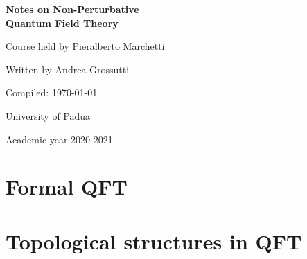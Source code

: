 \documentclass[a4paper]{report}
\newcommand{\onlyinsubfile}[1]{#1}
\newcommand{\onlyinmainfile}[1]{

\textsf{\red Part of the text is omitted from the compiled subfile, in order to make the compilation faster. You can find it in the main file. To avoid this, remove `` \textnormal{\textbackslash onlyinmainfile\{\ldots\}}'' from the code.}

}
\begin{document}
\renewcommand{\onlyinsubfile}[1]{}
\renewcommand{\onlyinmainfile}[1]{#1}

\begin{titlepage}
\begin{center}
       \vspace*{5cm}
       \textbf{\Huge Notes on Non-Perturbative\\[0.3em]
       Quantum Field Theory}
       
       \vspace{1cm}
        {\LARGE Course held by Pieralberto Marchetti}
        
        \vspace{1.5cm}
        {\Large Written by Andrea Grossutti}   
                 
       \vfill
       {\large Compiled: \today} 
           
       \vspace{2cm}        
       {\large University of Padua}  
        
       \vspace{0.8cm}
       {\large Academic year 2020-2021}
\end{center}
\end{titlepage}

\tableofcontents

\part{Formal QFT}





\part{Topological structures in QFT}



\nocite{*}
\printbibliography
\end{document}
